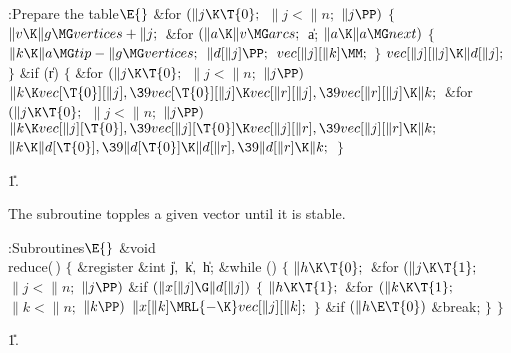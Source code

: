 \B{}:Prepare the  table\X${}\E{}$\6
\&{for} ${}(\|j\K\T{0};{}$ ${}\|j<\|n;{}$ ${}\|j\PP){}$\5
${}\{{}$\1\6
${}\|v\K\|g\MG\\{vertices}+\|j;{}$\6
\&{for} ${}(\|a\K\|v\MG\\{arcs};{}$ \|a; ${}\|a\K\|a\MG\\{next}){}$\5
${}\{{}$\1\6
${}\|k\K\|a\MG\\{tip}-\|g\MG\\{vertices};{}$\6
${}\|d[\|j]\PP;{}$\6
${}\\{vec}[\|j][\|k]\MM;{}$\6
\4${}\}{}$\2\6
${}\\{vec}[\|j][\|j]\K\|d[\|j];{}$\6
\4${}\}{}$\2\6
\&{if} (\|r)\5
${}\{{}$\1\6
\&{for} ${}(\|j\K\T{0};{}$ ${}\|j<\|n;{}$ ${}\|j\PP){}$\1\5
${}\|k\K\\{vec}[\T{0}][\|j],\39\\{vec}[\T{0}][\|j]\K\\{vec}[\|r][\|j],\39%
\\{vec}[\|r][\|j]\K\|k;{}$\2\6
\&{for} ${}(\|j\K\T{0};{}$ ${}\|j<\|n;{}$ ${}\|j\PP){}$\1\5
${}\|k\K\\{vec}[\|j][\T{0}],\39\\{vec}[\|j][\T{0}]\K\\{vec}[\|j][\|r],\39%
\\{vec}[\|j][\|r]\K\|k;{}$\2\6
${}\|k\K\|d[\T{0}],\39\|d[\T{0}]\K\|d[\|r],\39\|d[\|r]\K\|k;{}$\6
\4${}\}{}$\2\par
\U1.\fi

The  subroutine topples a given vector 
until it is stable.

\Y\B\4:Subroutines\X${}\E{}$\6
\&{void} \\{reduce}(\,)\1\1\2\2\6
${}\{{}$\1\6
\&{register} \&{int} \|j${},{}$ \|k${},{}$ \|h;\7
\&{while} ()\5
${}\{{}$\1\6
${}\|h\K\T{0};{}$\6
\&{for} ${}(\|j\K\T{1};{}$ ${}\|j<\|n;{}$ ${}\|j\PP){}$\1\6
\&{if} ${}(\|x[\|j]\G\|d[\|j]){}$\5
${}\{{}$\1\6
${}\|h\K\T{1};{}$\6
\&{for} ${}(\|k\K\T{1};{}$ ${}\|k<\|n;{}$ ${}\|k\PP){}$\1\5
${}\|x[\|k]\MRL{-{\K}}\\{vec}[\|j][\|k];{}$\2\6
\4${}\}{}$\2\2\6
\&{if} ${}(\|h\E\T{0}){}$\1\5
\&{break};\2\6
\4${}\}{}$\2\6
\4${}\}{}$\2\par
\U1.\fi

